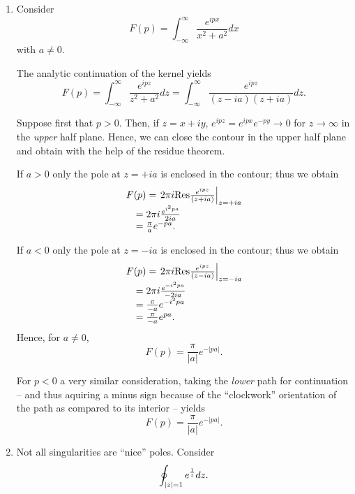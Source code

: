 {\begin{enumerate}
\item  Consider   $$F(p)=\int_{-\infty}^{\infty}\frac{ e^{ipx}}{x^2+a^2} dx$$ with $a\neq 0$.

The analytic continuation of the kernel yields
$$F(p)=\int_{-\infty}^{\infty}\frac{ e^{ipz}}{z^2+a^2} dz
=  \int_{-\infty}^{\infty}\frac{ e^{ipz}}{(z-ia)(z+ia)} dz
.$$

Suppose first that $p>0$. Then, if $z=x+iy$,  $e^{ipz}=e^{ipx}e^{-py}\rightarrow 0$
for $z \rightarrow \infty $
in the {\em upper} half plane.
Hence,  we can close the contour in the upper half plane and obtain
with the help of the residue theorem.

If $a>0$ only the pole at $z=+ia$ is enclosed in the contour; thus we obtain
\begin{equation}
\begin{array}{l}
F(p) =\left.  2\pi i  {\rm Res} \frac{ e^{ipz}}{(z+ia)} \right|_{z=+ia} \\
\quad      =  2\pi i   \frac{e^{i^2 pa}}{2ia} \\
\quad      =  \frac{\pi}{a}    e^{- pa}.
\end{array}
\end{equation}

If $a<0$ only the pole at $z=-ia$ is enclosed in the contour; thus we obtain
\begin{equation}
\begin{array}{l}
F(p) =\left.  2\pi i  {\rm Res} \frac{ e^{ipz}}{(z-ia)} \right|_{z=-ia} \\
\quad      =  2\pi i   \frac{e^{-i^2 pa}}{-2ia} \\
\quad      =  \frac{\pi}{-a}    e^{-i^2 pa} \\
\quad      =  \frac{\pi}{-a}    e^{ pa}
.
\end{array}
\end{equation}
Hence, for $a\neq 0$,
\begin{equation}
F(p) =  \frac{\pi}{\vert a\vert }    e^{ -\vert p a\vert}.
\end{equation}

For $p<0$ a very similar consideration, taking the {\em lower} path for continuation --
and thus aquiring a minus sign because of the ``clockwork''
orientation of the path as compared to its interior --
yields
\begin{equation}
F(p) =  \frac{\pi}{\vert a\vert }    e^{  - \vert pa\vert }.
\end{equation}


\item  Not all singularities are ``nice'' poles.
Consider   $$\oint_{\vert z\vert =1} e^{1\over z} dz.$$


\end{enumerate}}
